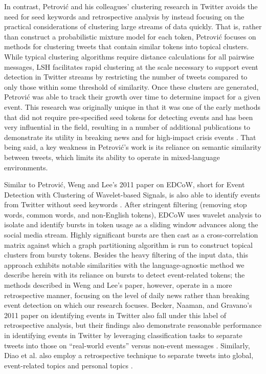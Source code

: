 \documentclass[letterpaper]{article}
\begin{document}
In contrast, Petrovi\'{c} and his colleagues' clustering research in Twitter avoids the need for seed keywords and retrospective analysis by instead focusing on the practical considerations of clustering large streams of data quickly.
That is, rather than construct a probabilistic mixture model for each token, Petrovi\'{c} focuses on methods for clustering tweets that contain similar tokens into topical clusters.
While typical clustering algorithms require distance calculations for all pairwise messages, LSH facilitates rapid clustering at the scale necessary to support event detection in Twitter streams by restricting the number of tweets compared to only those within some threshold of similarity.
Once these clusters are generated, Petrovi\'{c} was able to track their growth over time to determine impact for a given event.
This research was originally unique in that it was one of the early methods that did not require pre-specified seed tokens for detecting events and has been very influential in the field, resulting in a number of additional publications to demonstrate its utility in breaking news and for high-impact crisis events \cite{osborne2014real,petrovic2013can,6601695}.
That being said, a key weakness in Petrovi\'{c}'s work is its reliance on semantic similarity between tweets, which limits its ability to operate in mixed-language environments.

Similar to Petrovi\'{c}, Weng and Lee's 2011 paper on EDCoW, short for Event Detection with Clustering of Wavelet-based Signals, is also able to identify events from Twitter without seed keywords \cite{weng2011event}.
After stringent filtering (removing stop words, common words, and non-English tokens), EDCoW uses wavelet analysis to isolate and identify bursts in token usage as a sliding window advances along the social media stream.
Highly significant bursts are then cast as a cross-correlation matrix against which a graph partitioning algorithm is run to construct topical clusters from bursty tokens.
Besides the heavy filtering of the input data, this approach exhibits notable similarities with the language-agnostic method we describe herein with its reliance on bursts to detect event-related tokens; the methods described in Weng and Lee's paper, however, operate in a more retrospective manner, focusing on the level of daily news rather than breaking event detection on which our research focuses.
Becker, Naaman, and Gravano's 2011 paper on identifying events in Twitter also fall under this label of retrospective analysis, but their findings also demonstrate reasonable performance in identifying events in Twitter by leveraging classification tasks to separate tweets into those on ``real-world events'' versus non-event messages \cite{becker2011beyond-tr,becker2011beyond}.
Similarly, Diao et al. also employ a retrospective technique to separate tweets into global, event-related topics and personal topics \cite{diao2012finding}.
\end{document}
